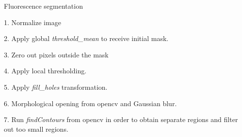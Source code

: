 

\begin{algorithm}
    \caption{Fluorescence segmentation}\label{alg:global-thresholding}
    \begin{algorithmic}
    \item 1. Normalize image
    \item 2. Apply global \textit{threshold\_mean} to receive initial mask.
    \item 3. Zero out pixels outside the mask
    \item 4. Apply local thresholding.  
    \item 5. Apply \textit{fill\_holes} transformation.
    \item 6. Morphological opening from opencv and Gaussian blur.
    \item 7. Run \textit{findContours} from opencv in order to obtain separate regions and filter out too small regions.
    \end{algorithmic}
\end{algorithm}    

